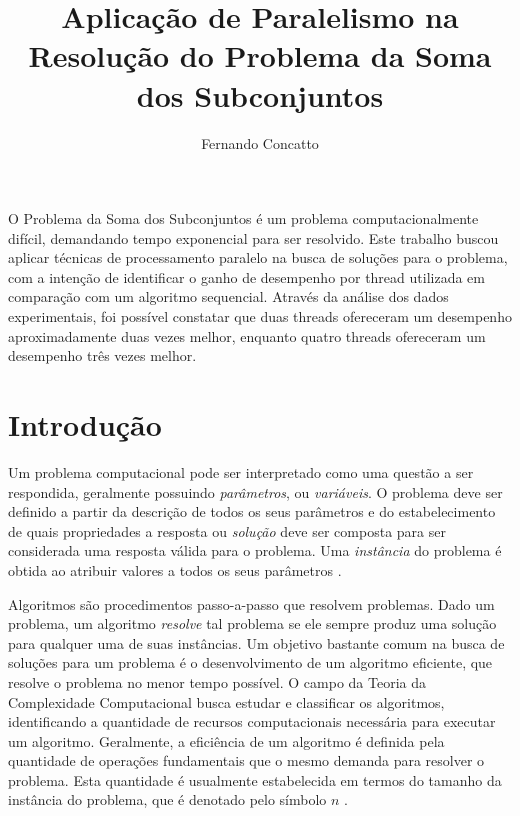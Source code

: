 \documentclass[12pt]{article}
\title{Aplicação de Paralelismo na Resolução do Problema da Soma dos Subconjuntos}
\author{Fernando Concatto\inst{1}}
\begin{document}
\maketitle

\begin{resumo}
  O Problema da Soma dos Subconjuntos é um problema computacionalmente difícil, demandando tempo exponencial para ser resolvido. Este trabalho buscou aplicar técnicas de processamento paralelo na busca de soluções para o problema, com a intenção de identificar o ganho de desempenho por thread utilizada em comparação com um algoritmo sequencial. Através da análise dos dados experimentais, foi possível constatar que duas threads ofereceram um desempenho aproximadamente duas vezes melhor, enquanto quatro threads ofereceram um desempenho três vezes melhor.
\end{resumo}


\section{Introdução} \label{sec:intro}

Um problema computacional pode ser interpretado como uma questão a ser respondida, geralmente possuindo \textit{parâmetros}, ou \textit{variáveis}. O problema deve ser definido a partir da descrição de todos os seus parâmetros e do estabelecimento de quais propriedades a resposta ou \textit{solução} deve ser composta para ser considerada uma resposta válida para o problema. Uma \textit{instância} do problema é obtida ao atribuir valores a todos os seus parâmetros \cite{Garey1979}.

Algoritmos são procedimentos passo-a-passo que resolvem problemas. Dado um problema, um algoritmo \textit{resolve} tal problema se ele sempre produz uma solução para qualquer uma de suas instâncias. Um objetivo bastante comum na busca de soluções para um problema é o desenvolvimento de um algoritmo eficiente, que resolve o problema no menor tempo possível. O campo da Teoria da Complexidade Computacional busca estudar e classificar os algoritmos, identificando a quantidade de recursos computacionais necessária para executar um algoritmo. Geralmente, a eficiência de um algoritmo é definida pela quantidade de operações fundamentais que o mesmo demanda para resolver o problema. Esta quantidade é usualmente estabelecida em termos do tamanho da instância do problema, que é denotado pelo símbolo $n$ \cite{Arora2009,Garey1979}.
\end{document}
